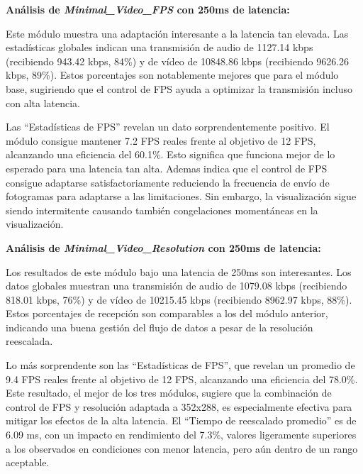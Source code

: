 \vspace{\baselineskip}

\textbf{Análisis de \textit{Minimal\_Video\_FPS} con 250ms de latencia:}
\vspace{\baselineskip}

Este módulo muestra una adaptación interesante a la latencia tan elevada. Las estadísticas globales indican una transmisión de audio de 1127.14 kbps (recibiendo 943.42 kbps, 84\%) y de vídeo de 10848.86 kbps (recibiendo 9626.26 kbps, 89\%). Estos porcentajes son notablemente mejores que para el módulo base, sugiriendo que el control de FPS ayuda a optimizar la transmisión incluso con alta latencia.
\vspace{\baselineskip}

Las ``Estadísticas de FPS'' revelan un dato sorprendentemente positivo. El módulo consigue mantener 7.2 FPS reales frente al objetivo de 12 FPS, alcanzando una eficiencia del 60.1\%. Esto significa que funciona mejor de lo esperado para una latencia tan alta. Ademas indica que el control de FPS consigue adaptarse satisfactoriamente reduciendo la frecuencia de envío de fotogramas para adaptarse a las limitaciones. Sin embargo, la visualización sigue siendo intermitente causando también congelaciones momentáneas en la visualización.

\vspace{\baselineskip}

\textbf{Análisis de \textit{Minimal\_Video\_Resolution} con 250ms de latencia:}
\vspace{\baselineskip}

Los resultados de este módulo bajo una latencia de 250ms son interesantes. Los datos globales muestran una transmisión de audio de 1079.08 kbps (recibiendo 818.01 kbps, 76\%) y de vídeo de 10215.45 kbps (recibiendo 8962.97 kbps, 88\%). Estos porcentajes de recepción son comparables a los del módulo anterior, indicando una buena gestión del flujo de datos a pesar de la resolución reescalada.
\vspace{\baselineskip}

Lo más sorprendente son las ``Estadísticas de FPS'', que revelan un promedio de 9.4 FPS reales frente al objetivo de 12 FPS, alcanzando una eficiencia del 78.0\%. Este resultado, el mejor de los tres módulos, sugiere que la combinación de control de FPS y resolución adaptada a 352x288, es especialmente efectiva para mitigar los efectos de la alta latencia. El ``Tiempo de reescalado promedio'' es de 6.09 ms, con un impacto en rendimiento del 7.3\%, valores ligeramente superiores a los observados en condiciones con menor latencia, pero aún dentro de un rango aceptable.
\vspace{\baselineskip}


